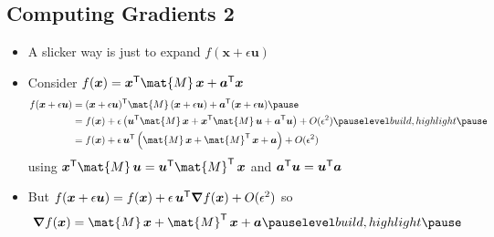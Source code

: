 \begin{slide}
\section{Computing Gradients 2}

\begin{PauseHighLight}
  \begin{itemize}
  \item A slicker way is just to expand $f(\bm{x}+ \epsilon
    \bm{u})$\pause
  \item Consider $f(\bm{x}) = \bm{x}^\tr \mat{M}\,\bm{x} +
    \bm{a}^\tr\bm{x}$
    \begin{align*}
      f(\bm{x}+ \epsilon \bm{u}) &= (\bm{x}+ \epsilon \bm{u})^\tr
      \mat{M}\, (\bm{x}+ \epsilon \bm{u})  +    \bm{a}^\tr(\bm{x}+
      \epsilon \bm{u}) \pause\\
      &= f(\bm{x}) + \epsilon\bra{ \bm{u}^\tr\mat{M}\, \bm{x} +
        \bm{x}^\tr\mat{M}\, \bm{u} + \bm{a}^\tr\bm{u}} +O(\epsilon^2)  \pauseb\\
      &= f(\bm{x}) + \epsilon\, \bm{u}^\tr \bra{\mat{M}\, \bm{x}+
        \mat{M}^\tr\, \bm{x} + \bm{a} }+O(\epsilon^2) 
    \end{align*}
    using $\bm{x}^\tr\mat{M}\, \bm{u}  = \bm{u}^\tr\mat{M}^\tr\,
    \bm{x}$ and $\bm{a}^{\textsf{T}}\bm{u} = \bm{u}^{\textsf{T}}\bm{a}$\pauseb
  \item But $
      f(\bm{x}+ \epsilon \bm{u})  = f(\bm{x})  + \epsilon \,
      \bm{u}^{\textsf{T}} \bm{\nabla} f(\bm{x})  + O(\epsilon^2)$ so
    \begin{align*}
      \grad f(\bm{x}) = \mat{M}\, \bm{x}+
        \mat{M}^\tr\, \bm{x} + \bm{a} \pauseb
    \end{align*}
  \end{itemize}
\end{PauseHighLight}

\end{slide}


